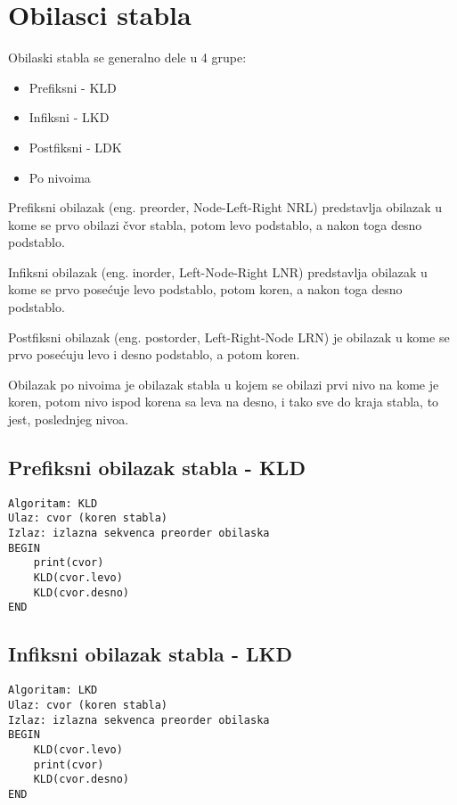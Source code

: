 \documentclass{memoir}
\begin{document}
\section{Obilasci stabla}
Obilaski stabla se generalno dele u 4 grupe:
\begin{itemize}
 \item Prefiksni - KLD
 \item Infiksni - LKD
 \item Postfiksni - LDK
 \item Po nivoima
\end{itemize}

\begin{description}
 \item Prefiksni obilazak (eng. preorder, Node-Left-Right NRL) predstavlja obilazak u kome se prvo obilazi
	čvor stabla, potom levo podstablo, a nakon toga desno podstablo.
 \item Infiksni obilazak (eng. inorder, Left-Node-Right LNR) predstavlja obilazak u kome se prvo posećuje levo
	podstablo, potom koren, a nakon toga desno podstablo.
 \item Postfiksni obilazak (eng. postorder, Left-Right-Node LRN) je obilazak u kome se prvo posećuju levo i desno 
	podstablo, a potom koren.
 \item Obilazak po nivoima je obilazak stabla u kojem se obilazi prvi nivo na kome je koren, potom nivo ispod korena sa 
	leva na desno, i tako sve do kraja stabla, to jest, poslednjeg nivoa.
\end{description}

\subsection{Prefiksni obilazak stabla - KLD}
\begin{lstlisting}
Algoritam: KLD
Ulaz: cvor (koren stabla)
Izlaz: izlazna sekvenca preorder obilaska
BEGIN
	print(cvor)
	KLD(cvor.levo)
	KLD(cvor.desno)
END
\end{lstlisting}

\subsection{Infiksni obilazak stabla - LKD}
\begin{lstlisting}
Algoritam: LKD
Ulaz: cvor (koren stabla)
Izlaz: izlazna sekvenca preorder obilaska
BEGIN
	KLD(cvor.levo)
	print(cvor)
	KLD(cvor.desno)
END
\end{lstlisting}
\end{document}
